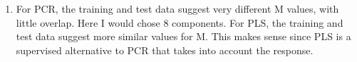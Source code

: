 \begin{enumerate}
\item For PCR, the training and test data suggest very different M values, with little overlap. Here I would chose 8 components. For PLS, the training and test data suggest more similar values for M. This makes sense since PLS is a supervised alternative to PCR that takes into account the response. 
\end{enumerate}